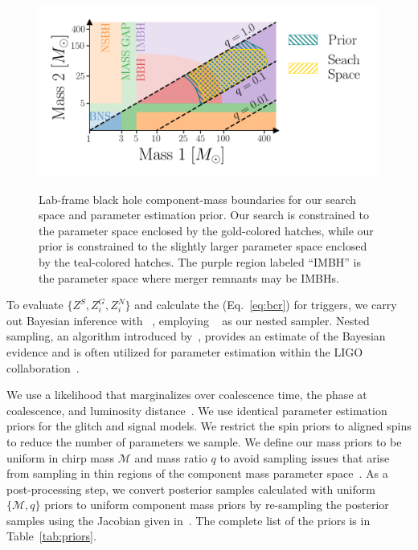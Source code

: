 \documentclass[useAMS,fleqn, usenatbib, final]{mnras}
\begin{document}
\begin{figure}
{\centering \includegraphics[width=0.75\linewidth]{images/template_bank.png}
}
\caption[ BCR search space.]{Lab-frame black hole component-mass boundaries for our search space and parameter estimation prior. Our search is constrained to the parameter space enclosed by the gold-colored hatches, while our prior is constrained to the slightly larger parameter space enclosed by the teal-colored hatches. The purple region labeled ``IMBH'' is the parameter space where merger remnants may be IMBHs.}\label{fig:templateBank}
\end{figure}


To evaluate $\{Z^S, Z^G_i, Z^N_i\}$ and calculate the \bcr (Eq.~\ref{eq:bcr}) for triggers, we carry out Bayesian inference with \bilby~\citep{bilby, bilby_pipe}, employing \dynesty~\citep{dynesty} as our nested sampler. Nested sampling, an algorithm introduced by~\citet{skilling2004, skilling2006}, provides an estimate of the Bayesian evidence and is often utilized for parameter estimation within the LIGO collaboration~\citep{bilby, bilby_paper, pbilby_paper}.

We use a likelihood that marginalizes over coalescence time, the phase at coalescence, and luminosity distance~\citep[see][Eq.~80]{intro_to_gw_bayes}. We use identical parameter estimation priors for the glitch and signal models. We restrict the spin priors to aligned spins to reduce the number of parameters we sample. We define our mass priors to be uniform in chirp mass $\mathcal{M}$ and mass ratio $q$ to avoid sampling issues that arise from sampling in thin regions of the component mass parameter space~\citep{bilby_gwtc}. As a post-processing step, we convert posterior samples calculated with uniform $\{\mathcal{M}, q\}$ priors to uniform component mass priors by re-sampling the posterior samples using the Jacobian given in~\citet[Eq.~21]{Veitch:2015:PhRvD}. The complete list of the priors is in Table~\ref{tab:priors}.
\end{document}
